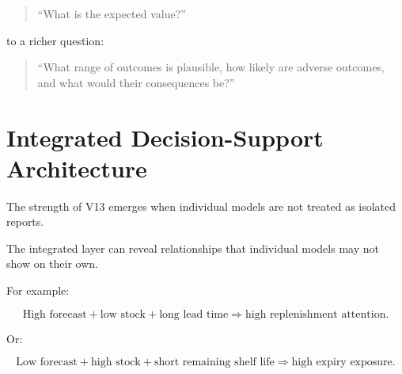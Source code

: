 \documentclass[11pt,a4paper]{article}
\begin{document}
\begin{quote}
``What is the expected value?''
\end{quote}

to a richer question:

\begin{quote}
``What range of outcomes is plausible, how likely are adverse outcomes, and
what would their consequences be?''
\end{quote}

\section{Integrated Decision-Support Architecture}

The strength of V13 emerges when individual models are not treated as isolated
reports.

\begin{center}
\end{center}

The integrated layer can reveal relationships that individual models may not
show on their own.

For example:

\[
\text{High forecast}
+
\text{low stock}
+
\text{long lead time}
\Rightarrow
\text{high replenishment attention}.
\]

Or:

\[
\text{Low forecast}
+
\text{high stock}
+
\text{short remaining shelf life}
\Rightarrow
\text{high expiry exposure}.
\]
\end{document}
